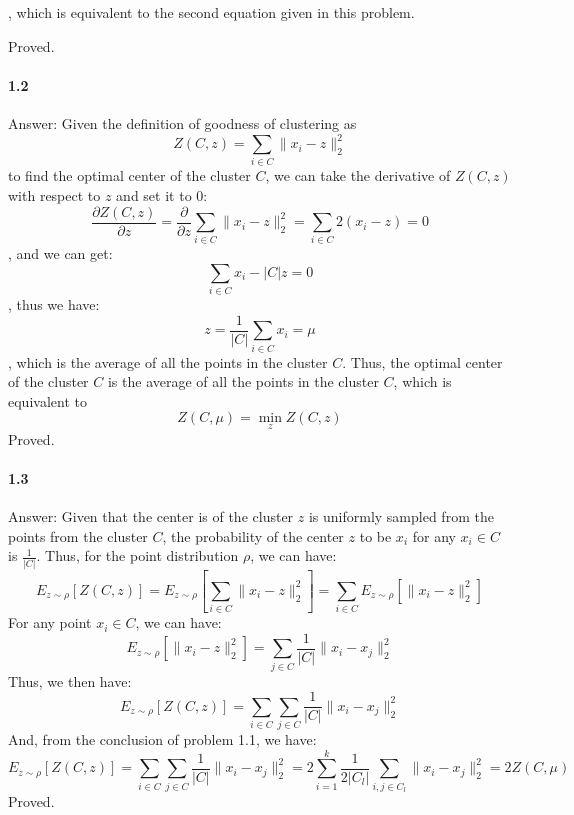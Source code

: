 \documentclass[11pt]{article}
\begin{document}
, which is equivalent to the second equation given in this problem.

Proved.

\paragraph{1.2}
Answer:
\newline
Given the definition of goodness of clustering as
\begin{equation}
  Z(C, z) = \sum_{i\in C} \|x_i - z\|_2^2
\end{equation}
to find the optimal center of the cluster $C$, we can take the derivative of $Z(C, z)$ with respect to $z$ and set it to 0:
\begin{equation}
  \frac{\partial Z(C, z)}{\partial z} = \frac{\partial}{\partial z} \sum_{i\in C} \|x_i - z\|_2^2 = \sum_{i\in C} 2(x_i - z) = 0
\end{equation}
, and we can get:
\begin{equation}
  \sum_{i\in C} x_i - |C|z = 0
\end{equation}
, thus we have:
\begin{equation}
  z = \frac{1}{|C|}\sum_{i\in C} x_i = \mu
\end{equation}
, which is the average of all the points in the cluster $C$.
Thus, the optimal center of the cluster $C$ is the average of all the points in the cluster $C$, which is equivalent to 
\begin{equation}
  Z(C, \mu) = \min_{z} Z(C, z)
\end{equation}
Proved.

\paragraph{1.3}
Answer:
\newline
Given that the center is of the cluster $z$ is uniformly sampled from the points from the cluster $C$, the probability of the center $z$ to be $x_i$ for any $x_i \in C$ is $\frac{1}{|C|}$. Thus, for the point distribution $\rho$, we can have:
\begin{equation}
  E_{z \sim \rho}[Z(C,z)] = E_{z \sim \rho}[\sum_{i\in C} \|x_i - z\|_2^2] = \sum_{i\in C} E_{z \sim \rho}[\|x_i - z\|_2^2]
\end{equation}
For any point $x_i \in C$, we can have:
\begin{equation}
E_{z \sim \rho}[\|x_i - z\|_2^2] = \sum_{j\in C} \frac{1}{|C|}\|x_i - x_j\|_2^2
\end{equation}
Thus, we then have:
\begin{equation}
  E_{z \sim \rho}[Z(C,z)] = \sum_{i\in C} \sum_{j\in C} \frac{1}{|C|}\|x_i - x_j\|_2^2 
\end{equation}
And, from the conclusion of problem 1.1, we have:
\begin{equation}
  E_{z \sim \rho}[Z(C,z)]  = \sum_{i\in C} \sum_{j\in C} \frac{1}{|C|}\|x_i - x_j\|_2^2 = 2\sum_{i=1}^k \frac{1}{2|C_l|}\sum_{i,j \in C_l} \|x_i - x_j\|_2^2 = 2Z(C, \mu)
\end{equation}
Proved.
\end{document}
